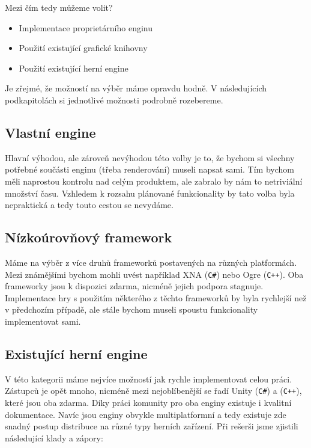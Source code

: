 Mezi čím tedy můžeme volit?
\begin{itemize}
	\item Implementace proprietárního enginu
	\item Použití existující grafické knihovny
	\item Použití existující herní engine
\end{itemize}

Je zřejmé, že možností na výběr máme opravdu hodně. V následujících podkapitolách si jednotlivé možnosti podrobně rozebereme.

\subsection{Vlastní engine}
Hlavní výhodou, ale zároveň nevýhodou této volby je to, že bychom si všechny potřebné součásti enginu (třeba renderování) museli napsat sami. Tím bychom měli naprostou kontrolu nad celým produktem, ale zabralo by nám to netriviální množství času.
Vzhledem k rozsahu plánované funkcionality by tato volba byla nepraktická a tedy touto cestou se nevydáme.

\subsection{Nízkoúrovňový framework}
Máme na výběr z více druhů frameworků postavených na různých platformách. Mezi známějšími bychom mohli uvést například XNA (\texttt{C\#}) nebo Ogre (\texttt{C++}). Oba frameworky jsou k dispozici zdarma, nicméně jejich podpora stagnuje. Implementace hry s použitím některého z těchto frameworků by byla rychlejší než v předchozím případě, ale stále bychom museli spoustu funkcionality implementovat sami. 

\subsection{Existující herní engine}
V této kategorii máme nejvíce možností jak rychle implementovat celou práci. Zástupců je opět mnoho, nicméně mezi nejoblíbenější se řadí Unity (\texttt{C\#}) a \UE{}(\texttt{C++}), které jsou oba zdarma. Díky práci komunity pro oba enginy existuje i kvalitní dokumentace. Navíc jsou enginy obvykle multiplatformní a tedy existuje zde snadný postup distribuce na různé typy herních zařízení. Při rešerši jsme zjistili následující klady a zápory:

